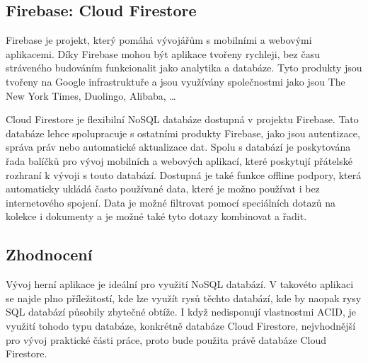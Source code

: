 \subsection{Firebase: Cloud Firestore}

Firebase je projekt,
který pomáhá vývojářům s mobilními a webovými aplikacemi.
Díky Firebase mohou být aplikace tvořeny rychleji,
bez času stráveného budováním funkcionalit jako analytika a databáze.
Tyto produkty jsou tvořeny na Google infrastruktuře
a jsou využívány společnostmi jako jsou The New York Times,
Duolingo, Alibaba, \dots{}
\cite{firebase}

Cloud Firestore je flexibilní NoSQL databáze dostupná v projektu Firebase.
Tato databáze lehce spolupracuje s ostatními produkty Firebase,
jako jsou autentizace, správa práv nebo automatické aktualizace dat.
Spolu s databází je poskytována řada balíčků pro vývoj mobilních a webových
aplikací,
které poskytují přátelské rozhraní k vývoji s touto databází.
Dostupná je také funkce offline podpory,
která automaticky ukládá často používané data,
které je možno používat i bez internetového spojení.
Data je možné filtrovat pomocí speciálních dotazů na kolekce i dokumenty
a je možné také tyto dotazy kombinovat a řadit.
\cite{cloud_firestore}

\subsection{Zhodnocení}

Vývoj herní aplikace je ideální pro využití NoSQL databází.
V takovéto aplikaci se najde plno příležitostí,
kde lze využít rysů těchto databází,
kde by naopak rysy SQL databází působily zbytečné obtíže.
I když nedisponují vlastnostmi ACID,
je využití tohodo typu databáze,
konkrétně databáze Cloud Firestore,
nejvhodnější pro vývoj praktické části práce,
proto bude použita právě databáze Cloud Firestore.

